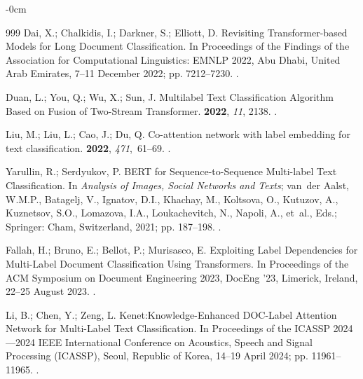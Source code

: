 \documentclass[make,article,accept,pdftex,moreauthors]{Definitions/mdpi}
\begin{document}
\begin{adjustwidth}{-\extralength}{0cm}
\begin{thebibliography}{999}
Dai, X.; Chalkidis, I.; Darkner, S.; Elliott, D.
\newblock Revisiting Transformer-based Models for Long Document Classification.
\newblock In Proceedings of the Findings of the Association for Computational
  Linguistics: EMNLP 2022, Abu Dhabi, United Arab Emirates, 7--11 December 2022; pp. 7212--7230.
.

Duan, L.; You, Q.; Wu, X.; Sun, J.
\newblock Multilabel Text Classification Algorithm Based on Fusion of
  Two-Stream Transformer.
 {\bf 2022}, {\em 11}, 2138.
.

Liu, M.; Liu, L.; Cao, J.; Du, Q.
\newblock Co-attention network with label embedding for text classification.
 {\bf 2022}, {\em 471},~61--69.
.

Yarullin, R.; Serdyukov, P.
\newblock BERT for Sequence-to-Sequence Multi-label Text Classification.
\newblock In \emph{Analysis of Images, Social Networks and Texts};
  van~der Aalst, W.M.P., Batagelj, V., Ignatov, D.I., Khachay, M., Koltsova,
  O., Kutuzov, A., Kuznetsov, S.O., Lomazova, I.A., Loukachevitch, N., Napoli,
  A.,  et~al., Eds.; Springer: Cham, Switzerland, 2021; pp. 187--198.
.

Fallah, H.; Bruno, E.; Bellot, P.; Murisasco, E.
\newblock Exploiting Label Dependencies for Multi-Label Document Classification
  Using Transformers.
\newblock In Proceedings of the ACM Symposium on Document
  Engineering 2023, DocEng '23, Limerick, Ireland, 22--25 August 2023. 
.

Li, B.; Chen, Y.; Zeng, L.
\newblock Kenet:Knowledge-Enhanced DOC-Label Attention Network for Multi-Label
  Text Classification.
\newblock In Proceedings of the ICASSP 2024---2024 IEEE International
  Conference on Acoustics, Speech and Signal Processing (ICASSP), Seoul, Republic of Korea, 14--19 April 2024; pp.
  11961--11965.
.


\end{thebibliography}
\end{adjustwidth}
\end{document}
